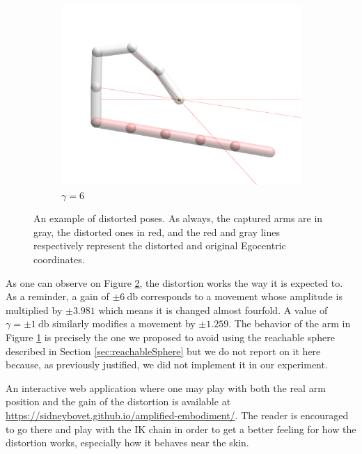 \begin{figure}[h]
\begin{subfigure}[b]{.3\textwidth}
        \includegraphics[width=\textwidth]{Figures/distortions/distortions6.png}
        \caption{$\gamma = 6$}
        \label{subfig:gamma6}
    \end{subfigure}
        
    \caption{An example of distorted poses. As always, the captured arms are in gray, the distorted ones in red, and the red and gray lines respectively represent the distorted and original Egocentric coordinates.}
    \label{fig:distortionExamples}
\end{figure}

As one can observe on Figure \ref{fig:distortionExamples}, the distortion works the way it is expected to. As a reminder, a gain of $\pm\SI{6}{\decibel}$ corresponds to a movement whose amplitude is multiplied by $\pm 3.981$ which means it is changed almost fourfold. A value of $\gamma = \pm\SI{1}{\decibel}$ similarly modifies a movement by $\pm 1.259$. The behavior of the arm in Figure \ref{subfig:gamma6} is precisely the one we proposed to avoid using the reachable sphere described in Section \ref{sec:reachableSphere} but we do not report on it here because, as previously justified, we did not implement it in our experiment.

An interactive web application where one may play with both the real arm position and the gain of the distortion is available at \url{https://sidneybovet.github.io/amplified-embodiment/}. The reader is encouraged to go there and play with the IK chain in order to get a better feeling for how the distortion works, especially how it behaves near the skin.


